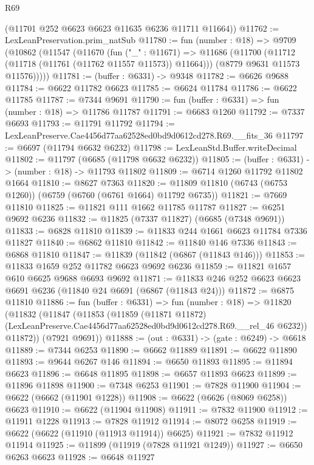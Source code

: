 \begin{lexlean}{R69}
\begin{coremodule}
{      (@11701 @252 @6623 @6623 @11635 @6236 @11711 @11664))
@11762 := LexLeanPreservation.prim_natSub
@11780 := fun (number : @18) =>
  @9709
    (@10862
      (@11547
        (@11670
          (fun ("_" : @11671) =>
          @11686
            (@11700 (@11712 (@11718 (@11761 (@11762 @11557 @11573)) @11664)))
            (@8779 @9631 @11573 @11576)))))
@11781 := (buffer : @6331) -> @9348
@11782 := @6626 @9688
@11784 := @6622 @11782 @6623
@11785 := @6624 @11784
@11786 := @6622 @11785
@11787 := @7344 @9691
@11790 := fun (buffer : @6331) => fun (number : @18) => @11786 @11787
@11791 := @6683 @1260
@11792 := @7337 @6693
@11793 := @11791 @11792
@11794 := LexLeanPreserve.Cae4456d77aa62528ed0bd9d0612cd278.R69.__fits_36
@11797 := @6697 (@11794 @6632 @6232)
@11798 := LexLeanStd.Buffer.writeDecimal
@11802 := @11797 (@6685 (@11798 @6632 @6232))
@11805 := (buffer : @6331) -> (number : @18) -> @11793 @11802
@11809 := @6714 @1260 @11792 @11802 @1664
@11810 := @8627 @7363
@11820 := @11809 @11810 (@6743 (@6753 @1260)) (@6759 (@6760 (@6761 @1664) @11792 @6735))
@11821 := @7669 @11810
@11825 := @11821 @111 @1662 @11785 @11787
@11827 := @6251 @9692 @6236
@11832 := @11825 (@7337 @11827) (@6685 (@7348 @9691))
@11833 := @6828 @11810
@11839 := @11833 @244 @1661 @6623 @11784 @7336 @11827
@11840 := @6862 @11810
@11842 := @11840 @146 @7336
@11843 := @6868 @11810
@11847 := @11839 (@11842 (@6867 (@11843 @146)))
@11853 := @11833 @1659 @252 @11782 @6623 @9692 @6236
@11859 := @11821 @1657 @610 @6625 @9688 @6693 @9692
@11871 := @11833 @246 @252 @6623 @6623 @6691 @6236 (@11840 @24 @6691 (@6867 (@11843 @24)))
@11872 := @6875 @11810
@11886 := fun (buffer : @6331) =>
  fun (number : @18) =>
  @11820
    (@11832
      (@11847
        (@11853
          (@11859
            (@11871 @11872)
            (LexLeanPreserve.Cae4456d77aa62528ed0bd9d0612cd278.R69.__rel_46 @6232))
          @11872))
      (@7921 @9691))
@11888 := (out : @6331) -> (gate : @6249) -> @6618
@11889 := @7344 @6253
@11890 := @6662 @11889
@11891 := @6622 @11890
@11893 := @9644 @6267 @146
@11894 := @6650 @11893
@11895 := @11894 @6623
@11896 := @6648 @11895
@11898 := @6657 @11893 @6623
@11899 := @11896 @11898
@11900 := @7348 @6253
@11901 := @7828 @11900
@11904 := @6622 (@6662 (@11901 @1228))
@11908 := @6622 (@6626 (@8069 @6258)) @6623
@11910 := @6622 (@11904 @11908)
@11911 := @7832 @11900
@11912 := @11911 @1228
@11913 := @7828 @11912
@11914 := @8072 @6258
@11919 := @6622 (@6622 (@11910 (@11913 @11914)) @6625)
@11921 := @7832 @11912 @11914
@11925 := @11899 (@11919 (@7828 @11921 @1249))
@11927 := @6650 @6263 @6623
@11928 := @6648 @11927
}
\end{coremodule}
\end{lexlean}
